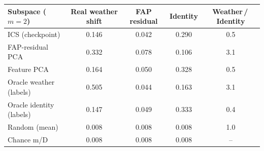 \begin{tabular}{lcccc}
\toprule
Subspace ($m{=}2$) & Real weather shift & FAP residual & Identity & Weather\,/\,Identity \\
\midrule
ICS (checkpoint) & 0.146 & 0.042 & 0.290 & 0.5 \\
FAP-residual PCA & 0.332 & 0.078 & 0.106 & 3.1 \\
Feature PCA & 0.164 & 0.050 & 0.328 & 0.5 \\
Oracle weather (labels) & 0.505 & 0.044 & 0.163 & 3.1 \\
Oracle identity (labels) & 0.147 & 0.049 & 0.333 & 0.4 \\
Random (mean) & 0.008 & 0.008 & 0.008 & 1.0 \\
Chance m/D & 0.008 & 0.008 & 0.008 & -- \\
\bottomrule
\end{tabular}
